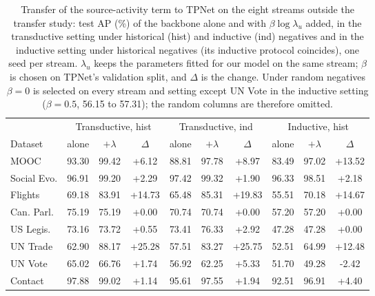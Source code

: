 \begin{table}[t]
\caption{Transfer of the source-activity term to TPNet on the eight streams outside the transfer study: test AP (\%) of the backbone alone and with $\beta\log\lambda_u$ added, in the transductive setting under historical (hist) and inductive (ind) negatives and in the inductive setting under historical negatives (its inductive protocol coincides), one seed per stream. $\lambda_u$ keeps the parameters fitted for our model on the same stream; $\beta$ is chosen on TPNet's validation split, and $\Delta$ is the change. Under random negatives $\beta=0$ is selected on every stream and setting except UN Vote in the inductive setting ($\beta=0.5$, 56.15 to 57.31); the random columns are therefore omitted.}
\label{tab:transfer_tpnet_streams}
\centering
\scriptsize
\setlength{\tabcolsep}{4pt}
\renewcommand{\arraystretch}{0.95}
\begin{tabular}{lccccccccc}
\toprule
 & \multicolumn{3}{c}{Transductive, hist} & \multicolumn{3}{c}{Transductive, ind} & \multicolumn{3}{c}{Inductive, hist} \\
\cmidrule(lr){2-4} \cmidrule(lr){5-7} \cmidrule(lr){8-10}
Dataset & alone & $+\lambda$ & $\Delta$ & alone & $+\lambda$ & $\Delta$ & alone & $+\lambda$ & $\Delta$ \\
\midrule
MOOC & 93.30 & 99.42 & +6.12 & 88.81 & 97.78 & +8.97 & 83.49 & 97.02 & +13.52 \\
Social Evo. & 96.91 & 99.20 & +2.29 & 97.42 & 99.32 & +1.90 & 96.33 & 98.51 & +2.18 \\
Flights & 69.18 & 83.91 & +14.73 & 65.48 & 85.31 & +19.83 & 55.51 & 70.18 & +14.67 \\
Can. Parl. & 75.19 & 75.19 & +0.00 & 70.74 & 70.74 & +0.00 & 57.20 & 57.20 & +0.00 \\
US Legis. & 73.16 & 73.72 & +0.55 & 73.41 & 76.33 & +2.92 & 47.28 & 47.28 & +0.00 \\
UN Trade & 62.90 & 88.17 & +25.28 & 57.51 & 83.27 & +25.75 & 52.51 & 64.99 & +12.48 \\
UN Vote & 65.02 & 66.76 & +1.74 & 56.92 & 62.25 & +5.33 & 51.70 & 49.28 & -2.42 \\
Contact & 97.88 & 99.02 & +1.14 & 95.61 & 97.55 & +1.94 & 92.51 & 96.91 & +4.40 \\
\bottomrule
\end{tabular}
\end{table}
